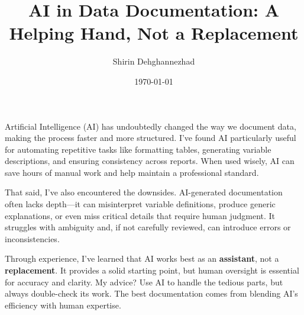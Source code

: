 \documentclass{article}
\title{AI in Data Documentation: A Helping Hand, Not a Replacement}
\author{Shirin Dehghannezhad}
\date{\today}
\begin{document}
\maketitle

Artificial Intelligence (AI) has undoubtedly changed the way we document data, making the process faster and more structured. I’ve found AI particularly useful for automating repetitive tasks like formatting tables, generating variable descriptions, and ensuring consistency across reports. When used wisely, AI can save hours of manual work and help maintain a professional standard.

That said, I’ve also encountered the downsides. AI-generated documentation often lacks depth—it can misinterpret variable definitions, produce generic explanations, or even miss critical details that require human judgment. It struggles with ambiguity and, if not carefully reviewed, can introduce errors or inconsistencies. 

Through experience, I’ve learned that AI works best as an \textbf{assistant}, not a \textbf{replacement}. It provides a solid starting point, but human oversight is essential for accuracy and clarity. My advice? Use AI to handle the tedious parts, but always double-check its work. The best documentation comes from blending AI’s efficiency with human expertise.
\end{document}
